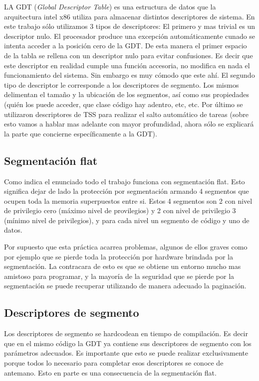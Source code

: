 	LA GDT (\textit{Global Descriptor Table})  es una estructura de datos
que la arquitectura intel x86 utiliza para almacenar distintos descriptores
de sistema. En este trabajo sólo utilizamos 3 tipos de descriptores: El
primero y mas trivial es un descriptor nulo. El procesador produce
una excepción automáticamente cunado se intenta acceder a la posición cero
de la GDT. De esta manera el primer espacio de la tabla se rellena con
un descriptor nulo para evitar confusiones. Es decir que este descriptor
en realidad cumple una función accesoria, no modifica en nada el funcionamiento
del sistema. Sin embargo es muy cómodo que este ahí. El segundo tipo
de descriptor le corresponde a los descriptores de segmento. Los mismos
delimentan el tamaño y la ubicación de los segmentos, así como sus propiedades
(quién los puede acceder, que clase código hay adentro, etc, etc. Por último
se utilizaron descriptores de TSS para realizar el salto automático de tareas
(sobre esto vamos a hablar mas adelante con mayor profundidad, ahora sólo
se explicará la parte que concierne específicamente a la GDT).


\subsection{Segmentación flat}

	Como indica el enunciado todo el trabajo funciona con segmentación flat.
Esto significa dejar de lado la protección por segmentación armando 4 segmentos
que ocupen toda la memoria superpuestos entre si. Estos 4 segmentos son 2
con nivel de privilegio cero (máximo nivel de provilegios) y 2 con nivel de privilegio
3 (mínimo nivel de privilegios), y para cada nivel un segmento de código y uno
de datos.

	Por supuesto que esta práctica acarrea problemas, algunos de ellos graves
como por ejemplo que se pierde toda la protección por hardware brindada
por la segmentación. La contracara de esto es que se obtiene un entorno
mucho mas amistoso para programar, y la mayoría de la seguridad que se pierde
por la segmentación se puede recuperar utilizando de manera adecuado la paginación.

\subsection{Descriptores de segmento}

	Los descriptores de segmento se hardcodean en tiempo de compilación. Es decir
que en el mismo código la GDT ya contiene sus descriptores de segmento con
los parámetros adecuados. Es importante que esto se puede realizar exclusivamente
porque todos lo necesario para completar esos descriptores se conoce de antemano.
Esto en parte es una consecuencia de la segmentación flat.

